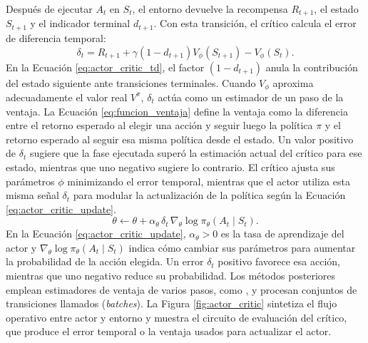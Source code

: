 Después de ejecutar $A_t$ en $S_t$, el entorno devuelve la recompensa $R_{t+1}$, el estado $S_{t+1}$ y el indicador terminal $d_{t+1}$. Con esta transición, el crítico calcula el error de diferencia temporal:
\begin{equation}
    \delta_t = R_{t+1} + \gamma(1-d_{t+1})V_\phi(S_{t+1}) - V_\phi(S_t).
    \label{eq:actor_critic_td}
\end{equation}
\begingroup
{}
En la Ecuación \eqref{eq:actor_critic_td}, el factor $(1-d_{t+1})$ anula la contribución del estado siguiente ante transiciones terminales. Cuando $V_\phi$ aproxima adecuadamente el valor real $V^\pi$, $\delta_t$ actúa como un estimador de un paso de la \gls{ventaja}. La Ecuación \eqref{eq:funcion_ventaja} define la ventaja como la diferencia entre el retorno esperado al elegir una acción y seguir luego la política $\pi$ y el retorno esperado al seguir esa misma política desde el estado. Un valor positivo de $\delta_t$ sugiere que la fase ejecutada superó la estimación actual del crítico para ese estado, mientras que uno negativo sugiere lo contrario. El crítico ajusta sus parámetros $\phi$ minimizando el error temporal, mientras que el actor utiliza esta misma señal $\delta_t$ para modular la actualización de la política según la Ecuación \eqref{eq:actor_critic_update}.
\begin{equation}
    \theta \leftarrow \theta + \alpha_\theta\,\delta_t\,
    \nabla_\theta \log \pi_\theta(A_t\mid S_t).
    \label{eq:actor_critic_update}
\end{equation}
\endgroup
En la Ecuación \eqref{eq:actor_critic_update}, $\alpha_\theta>0$ es la tasa de aprendizaje del actor y $\nabla_\theta \log \pi_\theta(A_t\mid S_t)$ indica cómo cambiar sus parámetros para aumentar la probabilidad de la acción elegida. Un error $\delta_t$ positivo favorece esa acción, mientras que uno negativo reduce su probabilidad. Los métodos posteriores emplean estimadores de ventaja de varios pasos, como , y procesan conjuntos de transiciones llamados  (\textit{batches}). La Figura \ref{fig:actor_critic} sintetiza el flujo operativo entre actor y entorno y muestra el circuito de evaluación del crítico, que produce el error temporal o la ventaja usados para actualizar el actor.

